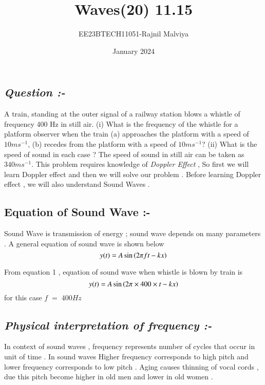\documentclass[journal,12pt,twocolumn]{IEEEtran}
\theoremstyle{remark}
\begin{document}
\title{Waves(20) 11.15}
\author{EE23BTECH11051-Rajnil Malviya}
\date{January 2024}
\maketitle
\subsection*{\textit{Question :-}}
A train, standing at the outer signal of a railway station blows a whistle of frequency
400 Hz in still air. (i) What is the frequency of the whistle for a platform observer
when the train (a) approaches the platform with a speed of $10 ms^{-1} $, (b) recedes
from the platform with a speed of $10 ms^{-1} $? (ii) What is the speed of sound in each
case ? The speed of sound in still air can be taken as $340 ms^{-1} $.
\bigskip
 This problem requires knowledge of \textit{Doppler Effect} , So first we will learn Doppler effect and then we will solve our problem . Before learning Doppler effect , we will also understand Sound Waves .
 \begin{table}[h!]
   
        
       
    \end{table}
\subsection*{Equation of Sound Wave :-}
Sound Wave is transmission of energy ; sound wave depends on many parameters . A general equation of sound wave is shown below 
\begin{equation} \label{eq1}
y(t) = A\sin\left(2 \pi ft - kx\right)
\end{equation}

 \begin{table}[h!]
   
        
       
    \end{table}

From equation 1 , equation of sound wave when whistle is blown by
train is 
\newpage
$$y(t) = A\sin\left(2 \pi \times400\times t - k x\right)$$ 
\;\;\;\;\;\;\;\;\;\;\;\;\;\;\;\;\;\;\;\;for this case $f\;=\;400Hz$\\
\subsection*{\textit{Physical interpretation of frequency :-}}
In context of sound waves , frequency represents number of cycles that occur in unit of time . In sound waves Higher frequency corresponds to high pitch and lower frequency corresponds to low pitch . Aging causes thinning of vocal cords , due this pitch become higher in old men and lower in old women .
\end{document}
